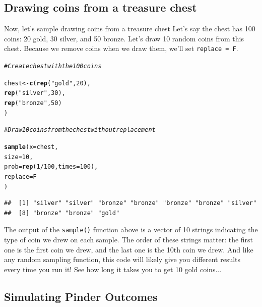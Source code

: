 \documentclass{tufte-book}\usepackage[]{graphicx}\usepackage[]{color}
\makeatletter
\newcommand{\hlnum}[1]{\textcolor[rgb]{0.686,0.059,0.569}{#1}}%
\newcommand{\hlstr}[1]{\textcolor[rgb]{0.192,0.494,0.8}{#1}}%
\newcommand{\hlcom}[1]{\textcolor[rgb]{0.678,0.584,0.686}{\textit{#1}}}%
\newcommand{\hlopt}[1]{\textcolor[rgb]{0,0,0}{#1}}%
\newcommand{\hlstd}[1]{\textcolor[rgb]{0.345,0.345,0.345}{#1}}%
\newcommand{\hlkwb}[1]{\textcolor[rgb]{0.69,0.353,0.396}{#1}}%
\newcommand{\hlkwc}[1]{\textcolor[rgb]{0.333,0.667,0.333}{#1}}%
\newcommand{\hlkwd}[1]{\textcolor[rgb]{0.737,0.353,0.396}{\textbf{#1}}}%
\newenvironment{kframe}{%
 \def\at@end@of@kframe{}%
 \ifinner\ifhmode%
  \def\at@end@of@kframe{\end{minipage}}%
  \begin{minipage}{\columnwidth}%
 \fi\fi%
 \def\FrameCommand##1{\hskip\@totalleftmargin \hskip-\fboxsep
 \colorbox{shadecolor}{##1}\hskip-\fboxsep
     \hskip-\linewidth \hskip-\@totalleftmargin \hskip\columnwidth}%
 \MakeFramed {\advance\hsize-\width
   \@totalleftmargin\z@ \linewidth\hsize
   \@setminipage}}%
 {\par\unskip\endMakeFramed%
 \at@end@of@kframe}
\newenvironment{knitrout}{}{} %
\makeatother
\begin{document}
\subsection{Drawing coins from a treasure chest}

Now, let's sample drawing coins from a treasure chest Let's say the chest has 100 coins: 20 gold, 30 silver, and 50 bronze. Let's draw 10 random coins from this chest. Because we remove coins when we draw them, we'll set \texttt{replace = F}.

\begin{knitrout}
\color{fgcolor}\begin{kframe}
\begin{alltt}
\hlcom{# Create chest with the 100 coins}

\hlstd{chest} \hlkwb{<-} \hlkwd{c}\hlstd{(}\hlkwd{rep}\hlstd{(}\hlstr{"gold"}\hlstd{,} \hlnum{20}\hlstd{),}
         \hlkwd{rep}\hlstd{(}\hlstr{"silver"}\hlstd{,} \hlnum{30}\hlstd{),}
         \hlkwd{rep}\hlstd{(}\hlstr{"bronze"}\hlstd{,} \hlnum{50}\hlstd{)}
         \hlstd{)}

\hlcom{# Draw 10 coins from the chest without replacement}

\hlkwd{sample}\hlstd{(}\hlkwc{x} \hlstd{= chest,}
       \hlkwc{size} \hlstd{=} \hlnum{10}\hlstd{,}
       \hlkwc{prob} \hlstd{=} \hlkwd{rep}\hlstd{(}\hlnum{1} \hlopt{/} \hlnum{100}\hlstd{,} \hlkwc{times} \hlstd{=} \hlnum{100}\hlstd{),}
       \hlkwc{replace} \hlstd{= F}
       \hlstd{)}
\end{alltt}
\begin{verbatim}
##  [1] "silver" "silver" "bronze" "bronze" "bronze" "bronze" "silver"
##  [8] "bronze" "bronze" "gold"
\end{verbatim}
\end{kframe}
\end{knitrout}

The output of the \texttt{sample()} function above is a vector of 10 strings indicating the type of coin we drew on each sample. The order of these strings matter: the first one is the first coin we drew, and the last one is the 10th coin we drew. And like any random sampling function, this code will likely give you different results every time you run it! See how long it takes you to get 10 gold coins...

\subsection{Simulating Pinder Outcomes}
\end{document}
